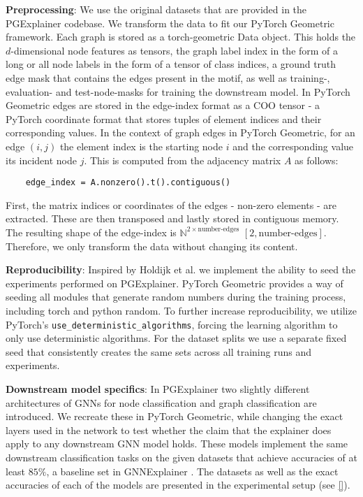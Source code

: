 \textbf{Preprocessing}: We use the original datasets that are provided in the PGExplainer codebase. We transform the data to fit our PyTorch Geometric framework. Each graph is stored as a torch-geometric Data object. This holds the $d$-dimensional node features as tensors, the graph label index in the form of a long or all node labels in the form of a tensor of class indices, a ground truth edge mask that contains the edges present in the motif, as well as training-, evaluation- and test-node-masks for training the downstream model. In PyTorch Geometric edges are stored in the edge-index format as a COO tensor - a PyTorch coordinate format that stores tuples of element indices and their corresponding values. In the context of graph edges in PyTorch Geometric, for an edge $(i,j)$ the element index is the starting node $i$ and the corresponding value its incident node $j$. This is computed from the adjacency matrix $A$ as follows:
\begin{verbatim}
    edge_index = A.nonzero().t().contiguous()
\end{verbatim}
First, the matrix indices or coordinates of the edges - non-zero elements - are extracted. These are then transposed and lastly stored in contiguous memory. The resulting shape of the edge-index is $\mathbb{N}^{2\times \text{number-edges}}$ $[2, \text{number-edges}]$. Therefore, we only transform the data without changing its content. \bigskip

\textbf{Reproducibility}: Inspired by Holdijk et al. \cite{holdijk2021re} we implement the ability to seed the experiments performed on PGExplainer. PyTorch Geometric provides a way of seeding all modules that generate random numbers during the training process, including torch and python random.
To further increase reproducibility, we utilize PyTorch's \verb|use_deterministic_algorithms|, forcing the learning algorithm to only use deterministic algorithms. For the dataset splits we use a separate fixed seed that consistently creates the same sets across all training runs and experiments.

\textbf{Downstream model specifics}: In PGExplainer two slightly different architectures of GNNs for node classification and graph classification are introduced. We recreate these in PyTorch Geometric, while changing the exact layers used in the network to test whether the claim that the explainer does apply to any downstream GNN model holds. These models implement the same downstream classification tasks on the given datasets that achieve accuracies of at least $85\%$, a baseline set in GNNExplainer \cite{}. The datasets as well as the exact accuracies of each of the models are presented in the experimental setup (see \ref{}). 

